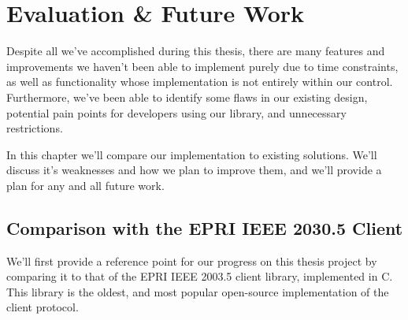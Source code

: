 \chapter{Evaluation \& Future Work}\label{ch:future}
Despite all we've accomplished during this thesis, there are many features and improvements we haven't been able to implement purely due to time constraints, as well as functionality whose implementation is not entirely within our control.
Furthermore, we've been able to identify some flaws in our existing design, potential pain points for developers using our library, and unnecessary restrictions.

In this chapter we'll compare our implementation to existing solutions.
We'll discuss it's weaknesses and how we plan to improve them, and we'll provide a plan for any and all future work.

\section{Comparison with the EPRI IEEE 2030.5 Client}
We'll first provide a reference point for our progress on this thesis project by comparing it to that of the EPRI IEEE 2003.5 client library, implemented in C.
This library is the oldest, and most popular open-source implementation of the client protocol.

